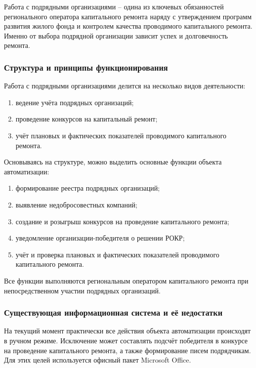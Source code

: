 Работа с подрядными организациями -- одина из ключевых обязанностей регионального оператора капитального ремонта наряду с утверждением программ развития жилого фонда и контролем качества проводимого капитального ремонта.
Именно от выбора подрядной организации зависит успех и долговечность ремонта.

\subsubsection{Структура и принципы функционирования}

Работа с подрядными организациями делится на несколько видов деятельности:

\begin{enumerate}
	\item ведение учёта подрядных организаций;
	\item проведение конкурсов на капитальный ремонт;
	\item учёт плановых и фактических показателей проводимого капитального ремонта.
\end{enumerate}

Основываясь на структуре, можно выделить основные функции объекта автоматизации:

\begin{enumerate}
	\item формирование реестра подрядных организаций;
	\item выявление недобросовестных компаний;
	\item создание и розыгрыш конкурсов на проведение капитального ремонта;
	\item уведомление организации-победителя о решении РОКР;
	\item учёт и проверка плановых и фактических показателей проводимого капитального ремонта.
\end{enumerate}

Все функции выполняются региональным оператором капитального ремонта при непосредственном участии подрядных организаций.

\subsubsection{Существующая информационная система и её недостатки}

На текущий момент практически все действия объекта автоматизации происходят в ручном режиме.
Исключение может составлять подсчёт победителя в конкурсе на проведение капитального ремонта, а также формирование писем подрядчикам.
Для этих целей используется офисный пакет Microsoft Office.

